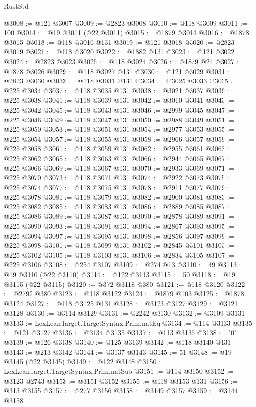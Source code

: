 \begin{lexlean}{RustStd}
\begin{coremodule}
@3008 := @121 @3007
@3009 := @2823 @3008
@3010 := @118 @3009
@3011 := 100
@3014 := @19 @3011 (@22 @3011)
@3015 := @1879 @3014
@3016 := @1878 @3015
@3018 := @118 @3016 @131
@3019 := @121 @3018
@3020 := @2823 @3019
@3021 := @118 @3020
@3022 := @1882 @131
@3023 := @121 @3022
@3024 := @2823 @3023
@3025 := @118 @3024
@3026 := @1879 @24
@3027 := @1878 @3026
@3029 := @118 @3027 @131
@3030 := @121 @3029
@3031 := @2823 @3030
@3033 := @118 @3031 @131
@3034 := @3025 @3033
@3035 := @225 @3034
@3037 := @118 @3035 @131
@3038 := @3021 @3037
@3039 := @225 @3038
@3041 := @118 @3039 @131
@3042 := @3010 @3041
@3043 := @225 @3042
@3045 := @118 @3043 @131
@3046 := @2999 @3045
@3047 := @225 @3046
@3049 := @118 @3047 @131
@3050 := @2988 @3049
@3051 := @225 @3050
@3053 := @118 @3051 @131
@3054 := @2977 @3053
@3055 := @225 @3054
@3057 := @118 @3055 @131
@3058 := @2966 @3057
@3059 := @225 @3058
@3061 := @118 @3059 @131
@3062 := @2955 @3061
@3063 := @225 @3062
@3065 := @118 @3063 @131
@3066 := @2944 @3065
@3067 := @225 @3066
@3069 := @118 @3067 @131
@3070 := @2933 @3069
@3071 := @225 @3070
@3073 := @118 @3071 @131
@3074 := @2922 @3073
@3075 := @225 @3074
@3077 := @118 @3075 @131
@3078 := @2911 @3077
@3079 := @225 @3078
@3081 := @118 @3079 @131
@3082 := @2900 @3081
@3083 := @225 @3082
@3085 := @118 @3083 @131
@3086 := @2889 @3085
@3087 := @225 @3086
@3089 := @118 @3087 @131
@3090 := @2878 @3089
@3091 := @225 @3090
@3093 := @118 @3091 @131
@3094 := @2867 @3093
@3095 := @225 @3094
@3097 := @118 @3095 @131
@3098 := @2856 @3097
@3099 := @225 @3098
@3101 := @118 @3099 @131
@3102 := @2845 @3101
@3103 := @225 @3102
@3105 := @118 @3103 @131
@3106 := @2834 @3105
@3107 := @225 @3106
@3108 := @254 @3107
@3109 := @274 @13
@3110 := 49
@3113 := @19 @3110 (@22 @3110)
@3114 := @122 @3113
@3115 := 50
@3118 := @19 @3115 (@22 @3115)
@3120 := @372 @3118 @380
@3121 := @118 @3120
@3122 := @2792 @380
@3123 := @118 @3122
@3124 := @1879 @103
@3125 := @1878 @3124
@3127 := @118 @3125 @131
@3128 := @3123 @3127
@3129 := @3121 @3128
@3130 := @3114 @3129
@3131 := @2242 @3130
@3132 := @3109 @3131
@3133 := LexLeanTarget.TargetSyntax.Prim.natEq
@3134 := @114 @3133
@3135 := @121 @3127
@3136 := @3134 @3135
@3137 := @113 @3136
@3138 := "0"
@3139 := @126 @3138
@3140 := @125 @3139
@3142 := @118 @3140 @131
@3143 := @213 @3142
@3144 := @3137 @3143
@3145 := 51
@3148 := @19 @3145 (@22 @3145)
@3149 := @122 @3148
@3150 := LexLeanTarget.TargetSyntax.Prim.natSub
@3151 := @114 @3150
@3152 := @3123 @2743
@3153 := @3151 @3152
@3155 := @118 @3153 @131
@3156 := @313 @3155
@3157 := @277 @3156
@3158 := @3149 @3157
@3159 := @3144 @3158

\end{coremodule}
\end{lexlean}
